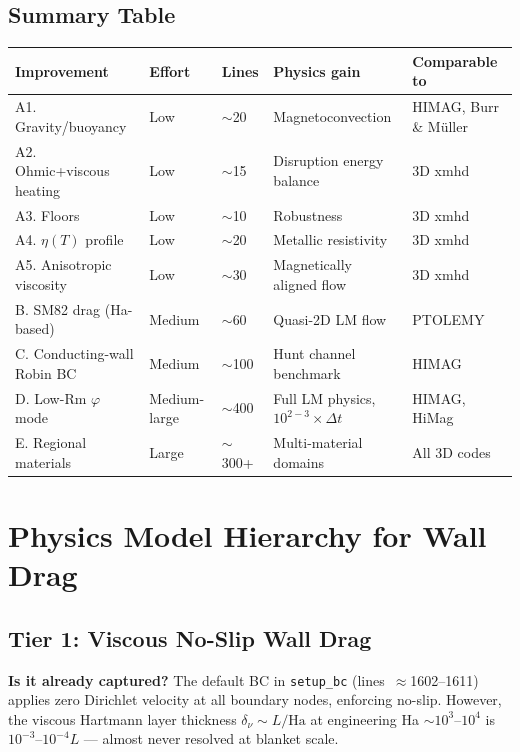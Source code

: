 \documentclass[11pt,letterpaper]{article}
\begin{document}
\subsection{Summary Table}

\begin{center}
\begin{longtable}{p{}p{}p{}p{}p{}}
\toprule
\textbf{Improvement} & \textbf{Effort} & \textbf{Lines} & \textbf{Physics gain} & \textbf{Comparable to} \\
\midrule
A1. Gravity/buoyancy & Low & $\sim$20 & Magnetoconvection & HIMAG, Burr \& Müller \\
A2. Ohmic+viscous heating & Low & $\sim$15 & Disruption energy balance & 3D xmhd \\
A3. Floors & Low & $\sim$10 & Robustness & 3D xmhd \\
A4. $\eta(T)$ profile & Low & $\sim$20 & Metallic resistivity & 3D xmhd \\
A5. Anisotropic viscosity & Low & $\sim$30 & Magnetically aligned flow & 3D xmhd \\
B. SM82 drag (Ha-based) & Medium & $\sim$60 & Quasi-2D LM flow & PTOLEMY \\
C. Conducting-wall Robin BC & Medium & $\sim$100 & Hunt channel benchmark & HIMAG \\
D. Low-Rm $\varphi$ mode & Medium-large & $\sim$400 & Full LM physics, $10^{2-3}\times \Delta t$ & HIMAG, HiMag \\
E. Regional materials & Large & $\sim$300+ & Multi-material domains & All 3D codes \\
\bottomrule
\end{longtable}
\end{center}

\section{Physics Model Hierarchy for Wall Drag}

\subsection{Tier 1: Viscous No-Slip Wall Drag}

\textbf{Is it already captured?}  The default BC in \texttt{setup\_bc}
(lines~$\approx$1602--1611) applies zero Dirichlet velocity at all boundary
nodes, enforcing no-slip.  However, the viscous Hartmann layer thickness
$\delta_\nu \sim L/\mathrm{Ha}$ at engineering Ha $\sim 10^3$--$10^4$ is
$10^{-3}$--$10^{-4} L$ --- almost never resolved at blanket scale.
\end{document}
